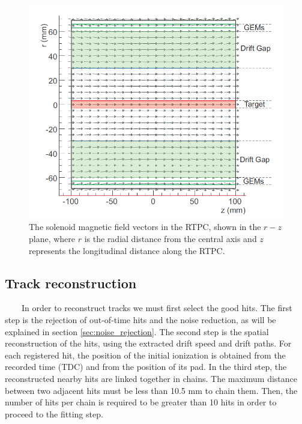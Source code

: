 \begin{figure}[tp]
\centering
\includegraphics[scale=0.40]{fig_rtpc/B_MAP.png}
\caption[]{The solenoid magnetic field vectors in the RTPC, shown in the $r-z$ plane, where $r$ is the radial distance from the central axis and $z$ represents the longitudinal distance along the RTPC.} 
\label{fig:B_MAP}
\end{figure}

\subsection{Track reconstruction}
~~~~In order to reconstruct tracks we must first select the good hits. The 
first step is the rejection of out-of-time hits and the noise reduction, as 
will be explained in section \ref{sec:noise_rejection}. The second step is the 
spatial reconstruction of the hits, using the extracted drift speed and drift 
paths. For each registered hit, the position of the initial ionization is 
obtained from the recorded time (TDC) and from the position of its pad.  In the 
third step, the reconstructed nearby hits are linked together in  chains.  The 
maximum distance between two adjacent hits must be less than 10.5 mm to chain 
them. Then, the number of hits per chain is required to be greater than 10 hits 
in order to proceed to the fitting step. \\


